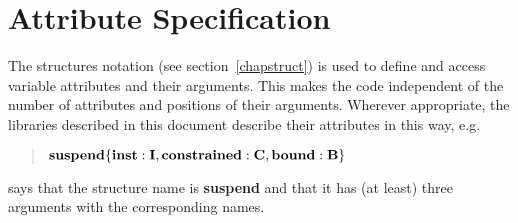 \section{Attribute Specification}
The structures notation (see section~\ref{chapstruct})
is used to define
and access variable attributes and their arguments.
This makes the code independent of the number of attributes
and positions of their arguments.
Wherever appropriate, the libraries described in this document
describe their attributes in this way, e.g.
\begin{quote}
${\bf suspend\{inst:I, constrained:C, bound:B\}}$
\end{quote}
says that the structure name is {\bf suspend} and that
it has (at least) three arguments with the corresponding names.





